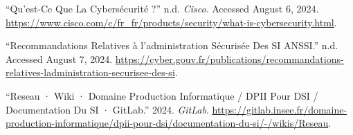 \documentclass[
  letterpaper,
  DIV=11,
  numbers=noendperiod]{scrartcl}
\newlength{\cslhangindent}
\newenvironment{CSLReferences}[2] %
 {\begin{list}{}{%
  \setlength{\itemindent}{0pt}
  \setlength{\leftmargin}{0pt}
  \setlength{\parsep}{0pt}
  \ifodd #1
   \setlength{\leftmargin}{\cslhangindent}
   \setlength{\itemindent}{-1\cslhangindent}
  \fi
  \setlength{\itemsep}{#2\baselineskip}}}
 {\end{list}}
\begin{document}
\begin{CSLReferences}{1}{0}
{``Qu'est-Ce Que La Cybersécurité ?''} n.d. \emph{Cisco}. Accessed
August 6, 2024.
\url{https://www.cisco.com/c/fr_fr/products/security/what-is-cybersecurity.html}.

{``Recommandations Relatives à l'administration Sécurisée Des {SI}
{\textbar} {ANSSI}.''} n.d. Accessed August 7, 2024.
\url{https://cyber.gouv.fr/publications/recommandations-relatives-ladministration-securisee-des-si}.

{``Reseau · {Wiki} · {Domaine} Production Informatique / {DPII} Pour
{DSI} / {Documentation} Du {SI} · {GitLab}.''} 2024. \emph{GitLab}.
\url{https://gitlab.insee.fr/domaine-production-informatique/dpii-pour-dsi/documentation-du-si/-/wikis/Reseau}.

\end{CSLReferences}
\end{document}
